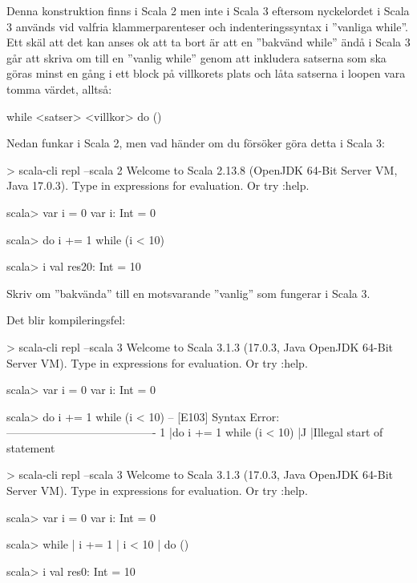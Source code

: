 Denna konstruktion finns i Scala 2 men inte i Scala 3 eftersom nyckelordet  i Scala 3 används vid valfria klammerparenteser och indenteringssyntax i ''vanliga while''. Ett skäl att det kan anses ok att ta bort  är att en ''bakvänd while'' ändå i Scala 3 går att skriva om till en ''vanlig while'' genom att inkludera satserna som ska göras minst en gång i ett block på villkorets plats och låta satserna i loopen vara tomma värdet, alltså:
\begin{Code}
while 
  <satser>
  <villkor>
do ()  
\end{Code}

\Subtask Nedan funkar i Scala 2, men vad händer om du försöker göra detta i Scala 3:
\begin{REPLnonum}
> scala-cli repl --scala 2
Welcome to Scala 2.13.8 (OpenJDK 64-Bit Server VM, Java 17.0.3).
Type in expressions for evaluation. Or try :help.

scala> var i = 0
var i: Int = 0

scala> do i += 1 while (i < 10)

scala> i
val res20: Int = 10
\end{REPLnonum}

\Subtask Skriv om ''bakvända''  till en motsvarande ''vanlig''  som fungerar i Scala 3.


\SOLUTION

\TaskSolved \what

\SubtaskSolved Det blir kompileringsfel:
\begin{REPLnonum}
> scala-cli repl --scala 3
Welcome to Scala 3.1.3 (17.0.3, Java OpenJDK 64-Bit Server VM).
Type in expressions for evaluation. Or try :help.
                                                                                    
scala> var i = 0
var i: Int = 0
                                                                                    
scala> do i += 1 while (i < 10)
-- [E103] Syntax Error: ----------------------------------------
1 |do i += 1 while (i < 10)
  |^^
  |Illegal start of statement
\end{REPLnonum}

\SubtaskSolved 
\begin{REPLnonum}
> scala-cli repl --scala 3
Welcome to Scala 3.1.3 (17.0.3, Java OpenJDK 64-Bit Server VM).
Type in expressions for evaluation. Or try :help.

scala> var i = 0
var i: Int = 0

scala> while
     |   i += 1
     |   i < 10
     | do ()

scala> i
val res0: Int = 10
\end{REPLnonum}



